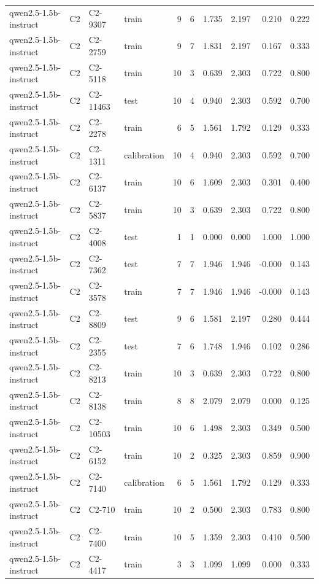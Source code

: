 \begin{table}
\begin{tabular}{llllrrrrrr}
qwen2.5-1.5b-instruct & C2 & C2-9307 & train & 9 & 6 & 1.735 & 2.197 & 0.210 & 0.222 \\
qwen2.5-1.5b-instruct & C2 & C2-2759 & train & 9 & 7 & 1.831 & 2.197 & 0.167 & 0.333 \\
qwen2.5-1.5b-instruct & C2 & C2-5118 & train & 10 & 3 & 0.639 & 2.303 & 0.722 & 0.800 \\
qwen2.5-1.5b-instruct & C2 & C2-11463 & test & 10 & 4 & 0.940 & 2.303 & 0.592 & 0.700 \\
qwen2.5-1.5b-instruct & C2 & C2-2278 & train & 6 & 5 & 1.561 & 1.792 & 0.129 & 0.333 \\
qwen2.5-1.5b-instruct & C2 & C2-1311 & calibration & 10 & 4 & 0.940 & 2.303 & 0.592 & 0.700 \\
qwen2.5-1.5b-instruct & C2 & C2-6137 & train & 10 & 6 & 1.609 & 2.303 & 0.301 & 0.400 \\
qwen2.5-1.5b-instruct & C2 & C2-5837 & train & 10 & 3 & 0.639 & 2.303 & 0.722 & 0.800 \\
qwen2.5-1.5b-instruct & C2 & C2-4008 & test & 1 & 1 & 0.000 & 0.000 & 1.000 & 1.000 \\
qwen2.5-1.5b-instruct & C2 & C2-7362 & test & 7 & 7 & 1.946 & 1.946 & -0.000 & 0.143 \\
qwen2.5-1.5b-instruct & C2 & C2-3578 & train & 7 & 7 & 1.946 & 1.946 & -0.000 & 0.143 \\
qwen2.5-1.5b-instruct & C2 & C2-8809 & test & 9 & 6 & 1.581 & 2.197 & 0.280 & 0.444 \\
qwen2.5-1.5b-instruct & C2 & C2-2355 & test & 7 & 6 & 1.748 & 1.946 & 0.102 & 0.286 \\
qwen2.5-1.5b-instruct & C2 & C2-8213 & train & 10 & 3 & 0.639 & 2.303 & 0.722 & 0.800 \\
qwen2.5-1.5b-instruct & C2 & C2-8138 & train & 8 & 8 & 2.079 & 2.079 & 0.000 & 0.125 \\
qwen2.5-1.5b-instruct & C2 & C2-10503 & train & 10 & 6 & 1.498 & 2.303 & 0.349 & 0.500 \\
qwen2.5-1.5b-instruct & C2 & C2-6152 & train & 10 & 2 & 0.325 & 2.303 & 0.859 & 0.900 \\
qwen2.5-1.5b-instruct & C2 & C2-7140 & calibration & 6 & 5 & 1.561 & 1.792 & 0.129 & 0.333 \\
qwen2.5-1.5b-instruct & C2 & C2-710 & train & 10 & 2 & 0.500 & 2.303 & 0.783 & 0.800 \\
qwen2.5-1.5b-instruct & C2 & C2-7400 & train & 10 & 5 & 1.359 & 2.303 & 0.410 & 0.500 \\
qwen2.5-1.5b-instruct & C2 & C2-4417 & train & 3 & 3 & 1.099 & 1.099 & 0.000 & 0.333 \\

\end{tabular}
\end{table}
